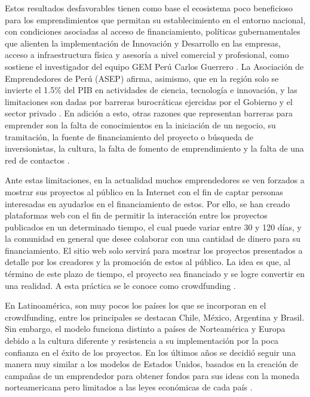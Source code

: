 Estos resultados desfavorables tienen como base el ecosistema poco beneficioso para los emprendimientos que permitan su establecimiento en el entorno nacional, con condiciones asociadas al acceso de financiamiento, políticas gubernamentales que alienten la implementación de Innovación y Desarrollo en las empresas, acceso a infraestructura física y asesoría a nivel comercial y profesional, como sostiene el investigador del equipo GEM Perú Carlos Guerrero \parencite{cr_gestion2018emprend}. La Asociación de Emprendedores de Perú (ASEP) afirma, asimismo, que en la región solo se invierte el 1.5\% del PIB en actividades de ciencia, tecnología e innovación, y las limitaciones son dadas por barreras burocráticas ejercidas por el Gobierno y el sector privado \parencite{cr_aep2018emprend}. En adición a esto, otras razones que representan barreras para emprender son la falta de conocimientos en la iniciación de un negocio, su tramitación, la fuente de financiamiento del proyecto o búsqueda de inversionistas, la cultura, la falta de fomento de emprendimiento y la falta de una red de contactos \parencite{cr_sandoval_barreras}.

Ante estas limitaciones, en la actualidad muchos emprendedores se ven forzados a mostrar sus proyectos al público en la Internet con el fin de captar personas interesadas en ayudarlos en el financiamiento de estos. Por ello, se han creado plataformas web con el fin de permitir la interacción entre los proyectos publicados en un determinado tiempo, el cual puede variar entre 30 y 120 días, y la comunidad en general que desee colaborar con una cantidad de dinero para su financiamiento. El sitio web solo servirá para mostrar los proyectos presentados a detalle por los creadores y la promoción de estos al público. La idea es que, al término de este plazo de tiempo, el proyecto sea financiado y se logre convertir en una realidad. A esta práctica se le conoce como crowdfunding \parencite{cr_uc_crowdfunding}.

En Latinoamérica, son muy pocos los países los que se incorporan en el crowdfunding, entre los principales se destacan Chile, México, Argentina y Brasil. Sin embargo, el modelo funciona distinto a países de Norteamérica y Europa debido a la cultura diferente y resistencia a su implementación por la poca confianza en el éxito de los proyectos. En los últimos años se decidió seguir una manera muy similar a los modelos de Estados Unidos, basados en la creación de campañas de un emprendedor para obtener fondos para sus ideas con la moneda norteamericana pero limitados a las leyes económicas de cada país \parencite{cr_sl_crowdfundlatam}.

